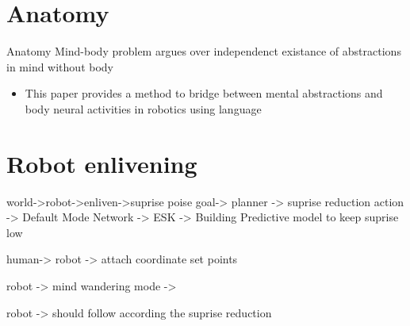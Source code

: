 \section{Anatomy}
    \begin{frame}[allowframebreaks]{Anatomy}
        Mind-body problem argues over independenct existance of abstractions in mind without body \cite{georgiev-2020-quantum-information-theoretic-approach-to-the-mind-brain-problem}
        
        \begin{itemize}
            \item This paper provides a method to bridge between mental abstractions and body neural activities in robotics using language
        \end{itemize}
        
        
        \section{Robot enlivening}
            world->robot->enliven->suprise poise goal-> planner -> suprise reduction action -> Default Mode Network -> ESK -> Building Predictive model to keep suprise low
            
            human-> robot -> attach coordinate set points
            
            robot -> mind wandering mode \cite{mason-2007-wandering-minds-the-default-network-and-stimulus-independent-thought} ->
            
            robot -> should follow according the suprise reduction
    
    \end{frame}
    
    \subsection{}
        
        